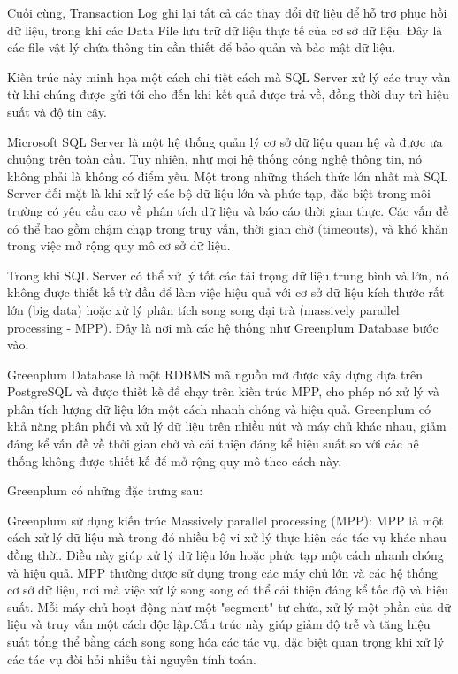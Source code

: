 \documentclass{article}[14pt]
\begin{document}
{Cuối cùng, Transaction Log ghi lại tất cả các thay đổi dữ liệu để hỗ trợ phục hồi dữ liệu, trong khi các Data File lưu trữ dữ liệu thực tế của cơ sở dữ liệu. Đây là các file vật lý chứa thông tin cần thiết để bảo quản và bảo mật dữ liệu.

Kiến trúc này minh họa một cách chi tiết cách mà SQL Server xử lý các truy vấn từ khi chúng được gửi tới cho đến khi kết quả được trả về, đồng thời duy trì hiệu suất và độ tin cậy.

Microsoft SQL Server là một hệ thống quản lý cơ sở dữ liệu quan hệ và được ưa chuộng trên toàn cầu. Tuy nhiên, như mọi hệ thống công nghệ thông tin, nó không phải là không có điểm yếu. Một trong những thách thức lớn nhất mà SQL Server đối mặt là khi xử lý các bộ dữ liệu lớn và phức tạp, đặc biệt trong môi trường có yêu cầu cao về phân tích dữ liệu và báo cáo thời gian thực. Các vấn đề có thể bao gồm chậm chạp trong truy vấn, thời gian chờ (timeouts), và khó khăn trong việc mở rộng quy mô cơ sở dữ liệu.

Trong khi SQL Server có thể xử lý tốt các tải trọng dữ liệu trung bình và lớn, nó không được thiết kế từ đầu để làm việc hiệu quả với cơ sở dữ liệu kích thước rất lớn (big data) hoặc xử lý phân tích song song đại trà (massively parallel processing - MPP). Đây là nơi mà các hệ thống như Greenplum Database bước vào.

Greenplum Database là một RDBMS mã nguồn mở được xây dựng dựa trên PostgreSQL và được thiết kế để chạy trên kiến trúc MPP, cho phép nó xử lý và phân tích lượng dữ liệu lớn một cách nhanh chóng và hiệu quả. Greenplum có khả năng phân phối và xử lý dữ liệu trên nhiều nút và máy chủ khác nhau, giảm đáng kể vấn đề về thời gian chờ và cải thiện đáng kể hiệu suất so với các hệ thống không được thiết kế để mở rộng quy mô theo cách này.

Greenplum có những đặc trưng sau:

Greenplum sử dụng kiến trúc Massively parallel processing (MPP): MPP là một
cách xử lý dữ liệu mà trong đó nhiều bộ vi xử lý thực hiện các tác vụ
khác nhau đồng thời. Điều này giúp xử lý dữ liệu lớn hoặc phức tạp
một cách nhanh chóng và hiệu quả. MPP thường được sử dụng trong
các máy chủ lớn và các hệ thống cơ sở dữ liệu, nơi mà việc xử lý song
song có thể cải thiện đáng kể tốc độ và hiệu suất.
Mỗi máy chủ hoạt động như một "segment" tự chứa, xử lý một phần
của dữ liệu và truy vấn một cách độc lập.Cấu trúc này giúp giảm độ trễ và tăng hiệu suất tổng thể bằng cách
song song hóa các tác vụ, đặc biệt quan trọng khi xử lý các tác vụ đòi
hỏi nhiều tài nguyên tính toán.

}
\end{document}
